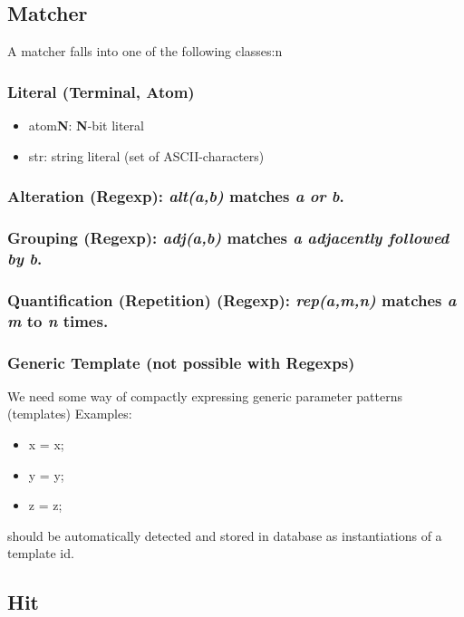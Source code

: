 \documentclass[a4paper,10pt,twocolumn]{article}
\begin{document}
\subsection{Matcher}

A matcher falls into one of the following classes:n

\subsubsection{Literal (Terminal, Atom)}

\begin{itemize}
\item atom\textbf{N}: \textbf{N}-bit literal
\item str: string literal (set of ASCII-characters)
\end{itemize}

\subsubsection{Alteration (Regexp): \textit{alt(a,b)} matches \textit{a}
  \emph{or} \textit{b}.}

\subsubsection{Grouping (Regexp): \textit{adj(a,b)}
  matches \textit{a} \emph{adjacently followed by} \textit{b}.}

\subsubsection{Quantification (Repetition) (Regexp): \textit{rep(a,m,n)}
  matches \textit{a} \textit{m} to \textit{n} times.}

\subsubsection{Generic Template (not possible with Regexps)}

We need some way of compactly expressing generic parameter patterns (templates)
Examples:
\begin{itemize}
\item x = x;
\item y = y;
\item z = z;
\end{itemize}
should be automatically detected and stored in database as instantiations of a
template id.

\subsection{Hit}
\end{document}
